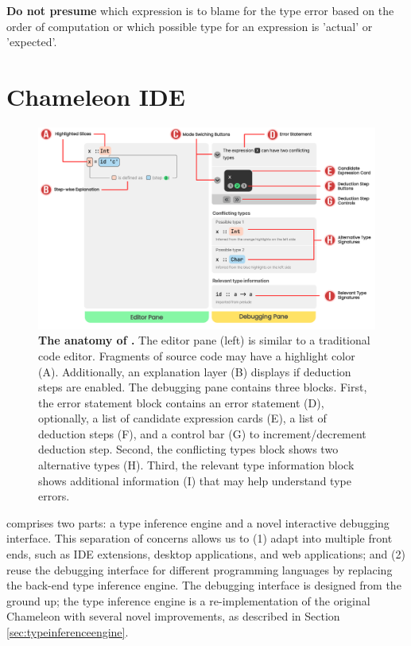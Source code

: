 \noindent\textbf{Do not presume} which expression is to blame for the type error based on the order of computation or which possible type for an expression is 'actual' or 'expected'.


\section{Chameleon IDE} \label{chameleon}
\begin{figure}
    \centering
    \includegraphics[width=\textwidth, trim=0mm 10mm 0mm 0mm]{images/atonomy.pdf}
    \caption{
        \textbf{The anatomy of \chameleon{}.}
        The editor pane (left) is similar to a traditional code editor. Fragments of source code may have a highlight
        color (A). Additionally, an explanation layer (B) displays if deduction steps are enabled. The debugging pane contains three blocks. First, the error statement block contains an error statement (D), optionally, a list of candidate expression cards (E), a list of deduction steps (F), and a control bar (G) to increment/decrement deduction step. Second, the conflicting types block shows two alternative types (H). Third, the relevant type information block shows additional information (I) that may help understand type errors.
    }
    \label{fig:anatomy}
\end{figure}


\chameleon{} comprises two parts: a type inference engine and a novel interactive debugging interface. This separation of concerns allows us to (1) adapt \chameleon{} into multiple front ends, such as IDE extensions, desktop applications, and web applications; and (2) reuse the debugging interface for different programming languages by replacing the back-end type inference engine. The debugging interface is designed from the ground up; the type inference engine is a re-implementation of the original Chameleon with several novel improvements, as described in Section \ref{sec:typeinferenceengine}.

